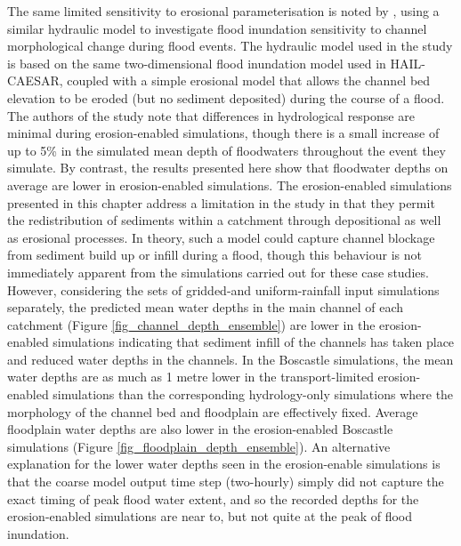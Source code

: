The same limited sensitivity to erosional parameterisation is noted by \citep{wong2015sensitivity}, using a similar hydraulic model to investigate flood inundation sensitivity to channel morphological change during flood events. The hydraulic model used in the \citet{wong2015sensitivity} study is based on the same two-dimensional flood inundation model used in HAIL-CAESAR, coupled with a simple erosional model that allows the channel bed elevation to be eroded (but no sediment deposited) during the course of a flood. The authors of the study note that differences in hydrological response are minimal during erosion-enabled simulations, though there is a small increase of up to 5\% in the simulated mean depth of floodwaters throughout the event they simulate. By contrast, the results presented here show that floodwater depths on average are lower in erosion-enabled simulations. The erosion-enabled simulations presented in this chapter address a limitation in the \citet{wong2015sensitivity} study in that they permit the redistribution of sediments within a catchment through depositional as well as erosional processes.  In theory, such a model could capture channel blockage from sediment build up or infill during a flood, though this behaviour is not immediately apparent from the simulations carried out for these case studies. However, considering the sets of gridded-and uniform-rainfall input simulations separately, the predicted mean water depths in the main channel of each catchment (Figure \ref{fig_channel_depth_ensemble}) are lower in the erosion-enabled simulations indicating that sediment infill of the channels has taken place and reduced water depths in the channels. In the Boscastle simulations, the mean water depths are as much as 1 metre lower in the transport-limited erosion-enabled simulations than the corresponding hydrology-only simulations where the morphology of the channel bed and floodplain are effectively fixed. Average floodplain water depths are also lower in the erosion-enabled Boscastle simulations (Figure \ref{fig_floodplain_depth_ensemble}). An alternative explanation for the lower water depths seen in the erosion-enable simulations is that the coarse model output time step (two-hourly) simply did not capture the exact timing of peak flood water extent, and so the recorded depths for the erosion-enabled simulations are near to, but not quite at the peak of flood inundation.

